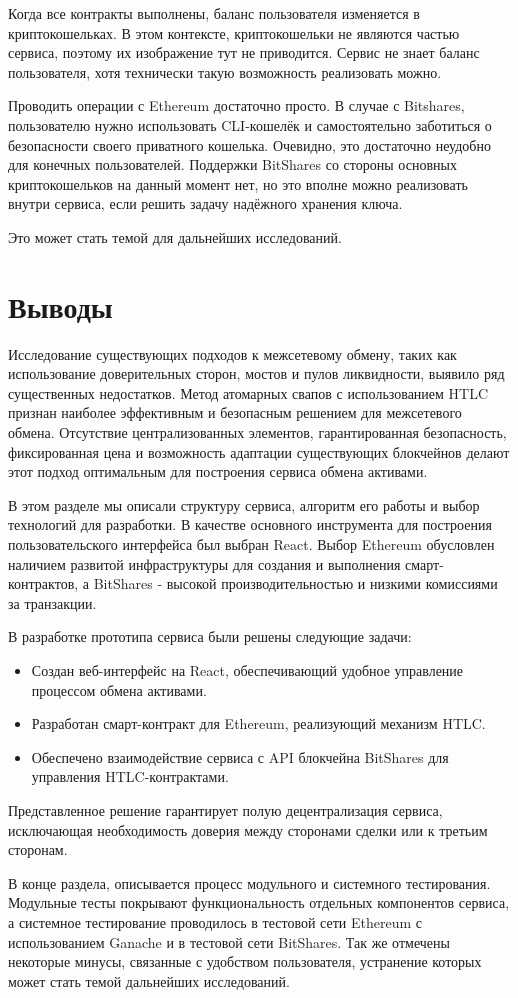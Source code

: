 Когда все контракты выполнены, баланс пользователя изменяется в криптокошельках. В этом контексте, криптокошельки не являются частью сервиса, поэтому их изображение тут не приводится. Сервис не знает баланс пользователя, хотя технически такую возможность реализовать можно.

Проводить операции с Ethereum достаточно просто. В случае с Bitshares, пользователю нужно использовать CLI-кошелёк и самостоятельно заботиться о безопасности своего приватного кошелька. Очевидно, это достаточно неудобно для конечных пользователей. Поддержки BitShares со стороны основных криптокошельков на данный момент нет, но это вполне можно реализовать внутри сервиса, если решить задачу надёжного хранения ключа.

Это может стать темой для дальнейших исследований.

\section{Выводы}

Исследование существующих подходов к межсетевому обмену, таких как использование доверительных сторон, мостов и пулов ликвидности, выявило ряд существенных недостатков. Метод атомарных свапов с использованием HTLC признан наиболее эффективным и безопасным решением для межсетевого обмена. Отсутствие централизованных элементов, гарантированная безопасность, фиксированная цена и возможность адаптации существующих блокчейнов делают этот подход оптимальным для построения сервиса обмена активами.

В этом разделе мы описали структуру сервиса, алгоритм его работы и выбор технологий для разработки. В качестве основного инструмента для построения пользовательского интерфейса был выбран React. Выбор Ethereum обусловлен наличием развитой инфраструктуры для создания и выполнения смарт-контрактов, а BitShares - высокой производительностью и низкими комиссиями за транзакции.

В разработке прототипа сервиса были решены следующие задачи:
\begin{itemize}
\item Создан веб-интерфейс на React, обеспечивающий удобное управление процессом обмена активами.
\item Разработан смарт-контракт для Ethereum, реализующий механизм HTLC.
\item Обеспечено взаимодействие сервиса с API блокчейна BitShares для управления HTLC-контрактами.
\end{itemize}

Представленное решение гарантирует полую децентрализация сервиса, исключающая необходимость доверия между сторонами сделки или к третьим сторонам.

В конце раздела, описывается процесс модульного и системного тестирования. Модульные тесты покрывают функциональность отдельных компонентов сервиса, а системное тестирование проводилось в тестовой сети Ethereum с использованием Ganache и в тестовой сети BitShares. Так же отмечены некоторые минусы, связанные с удобством пользователя, устранение которых может стать темой дальнейших исследований.

